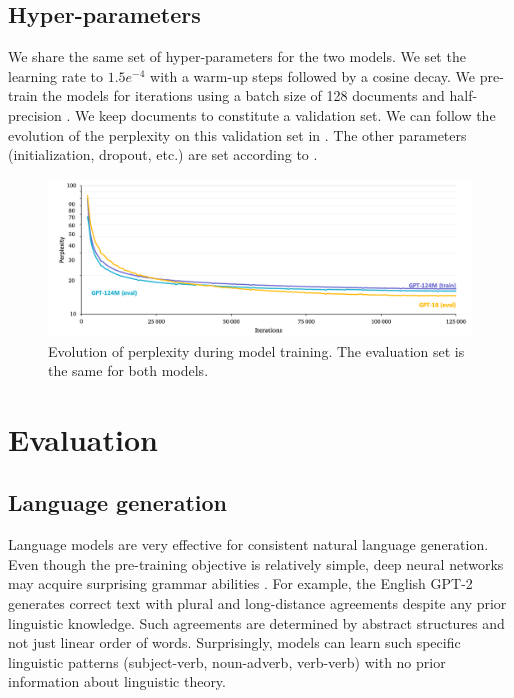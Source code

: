\subsection{Hyper-parameters}

We share the same set of hyper-parameters for the two models. We set the learning rate to $1.5e^{-4}$ with a  warm-up steps followed by a cosine decay. We pre-train the models for  iterations using a batch size of 128 documents and half-precision \parencite{micikevicius_18}. We keep  documents to constitute a validation set. We can follow the evolution of the perplexity on this validation set in . The other parameters (initialization, dropout, etc.) are set according to \textcite{radford_2018}.

\begin{figure}[!htb]
\begin{center}
\includegraphics[width=16cm]{images/gpt-fr-training-2.png}
\end{center}
\caption{Evolution of perplexity during model training. The evaluation set is the same for both models.}
\end{figure}

\section{Evaluation}

\subsection{Language generation}

Language models are very effective for consistent natural language generation. Even though the pre-training objective is relatively simple, deep neural networks may acquire surprising grammar abilities \parencite{linzen_2020}. For example, the English GPT-2 generates correct text with plural and long-distance agreements despite any prior linguistic knowledge. Such agreements are determined by abstract structures and not just linear order of words. Surprisingly, models can learn such specific linguistic patterns (subject-verb, noun-adverb, verb-verb) with no prior information about linguistic theory. 

